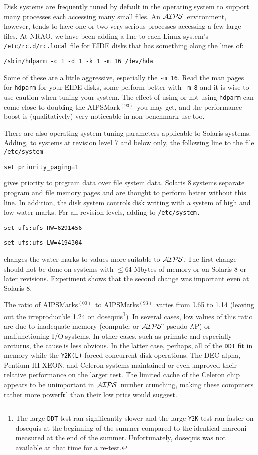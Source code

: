 \documentclass[twoside]{article}
\newcommand{\AIPS}{{$\cal AIPS\/$}}
\newcommand{\OMark}{AIPSMark$^{(93)}$}
\newcommand{\OMarks}{AIPSMarks$^{(93)}$}
\newcommand{\AMarks}{AIPSMarks$^{(00)}$}
\begin{document}
Disk systems are frequently tuned by default in the operating system
to support many processes each accessing many small files.  An \AIPS\
environment, however, tends to have one or two very serious processes
accessing a few large files.  At NRAO, we have been adding a line to
each Linux system's {\tt /etc/rc.d/rc.local} file for EIDE disks that
has something along the lines of:\hfil\break
\centerline{{\tt /sbin/hdparm -c 1 -d 1 -k 1 -m 16 /dev/hda}}
Some of these are a little aggressive, especially the {\tt -m 16}.
Read the man pages for {\tt hdparm} for your EIDE disks, some perform
better with {\tt -m 8} and it is wise to use caution when tuning your
system.  The effect of using or not using {\tt hdparm} can come close
to doubling the \OMark\ you may get, and the performance boost is
(qualitatively) very noticeable in non-benchmark use too.

There are also operating system tuning parameters applicable to
Solaris systems.  Adding, to systems at revision level 7 and below
only, the following line to the file {\tt /etc/system}\hfil\break
\centerline{{\tt set priority\_paging=1}}
gives priority to program data over file system data.  Solaris 8
systems separate program and file memory pages and are thought to
perform better without this line.  In addition, the disk system
controls disk writing with a system of high and low water marks.
For all revision levels, adding to {\tt /etc/system.}\hfil\break
\centerline{{\tt set ufs:ufs\_HW=6291456}}
\centerline{{\tt set ufs:ufs\_LW=4194304}}
changes the water marks to values more suitable to \AIPS\@.  The
first change should not be done on systems with $\leq 64$ Mbytes of
memory or on Solaris 8 or later revisions.  Experiment shows that the
second change was important even at Solaris 8.

The ratio of \AMarks\ to \OMarks\ varies from 0.65 to 1.14 (leaving
out the irreproducible 1.24 on dosequis\footnote{The large {\tt DDT}
test ran significantly slower and the large {\tt Y2K} test ran faster
on dosequis at the beginning of the summer compared to the identical
marconi measured at the end of the summer.  Unfortunately, dosequis
was not available at that time for a re-test.}).  In several cases,
low values of this ratio are due to inadequate memory (computer or
\AIPS' pseudo-AP) or malfunctioning I/O systems.  In other cases, such
as primate and especially arcturus, the cause is less obvious.  In the
latter case, perhaps, all of the {\tt DDT} fit in memory while the
{\tt Y2K(L)} forced concurrent disk operations.  The DEC alpha,
Pentium III XEON, and Celeron systems maintained or even improved
their relative performance on the larger test.  The limited cache of
the Celeron chip appears to be unimportant in \AIPS\  number
crunching, making these computers rather more powerful than their low
price would suggest.
\end{document}
